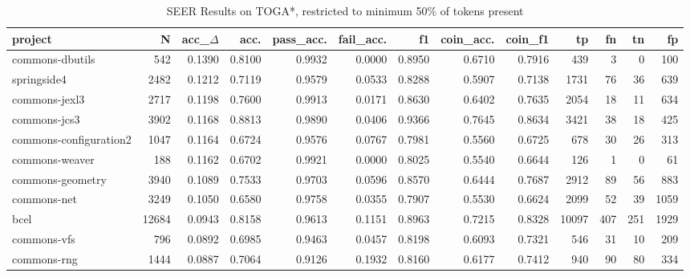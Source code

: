 \begin{table*}
\centering
\caption{SEER Results on TOGA*, restricted to minimum 50\% of tokens present}
\label{tab:toga_results_50}
\begin{tabular}{lrrrrrrrrrrrr}
\toprule
                project &       N &  acc\_$\Delta$ &    acc. &  pass\_acc. &  fail\_acc. &      f1 &  coin\_acc. &  coin\_f1 &      tp &    fn &   tn &     fp \\
\midrule
        commons-dbutils &     542 &      0.1390 &  0.8100 &     0.9932 &     0.0000 &  0.8950 &     0.6710 &   0.7916 &     439 &     3 &    0 &    100 \\
            springside4 &    2482 &      0.1212 &  0.7119 &     0.9579 &     0.0533 &  0.8288 &     0.5907 &   0.7138 &    1731 &    76 &   36 &    639 \\
          commons-jexl3 &    2717 &      0.1198 &  0.7600 &     0.9913 &     0.0171 &  0.8630 &     0.6402 &   0.7635 &    2054 &    18 &   11 &    634 \\
           commons-jcs3 &    3902 &      0.1168 &  0.8813 &     0.9890 &     0.0406 &  0.9366 &     0.7645 &   0.8634 &    3421 &    38 &   18 &    425 \\
 commons-configuration2 &    1047 &      0.1164 &  0.6724 &     0.9576 &     0.0767 &  0.7981 &     0.5560 &   0.6725 &     678 &    30 &   26 &    313 \\
         commons-weaver &     188 &      0.1162 &  0.6702 &     0.9921 &     0.0000 &  0.8025 &     0.5540 &   0.6644 &     126 &     1 &    0 &     61 \\
       commons-geometry &    3940 &      0.1089 &  0.7533 &     0.9703 &     0.0596 &  0.8570 &     0.6444 &   0.7687 &    2912 &    89 &   56 &    883 \\
            commons-net &    3249 &      0.1050 &  0.6580 &     0.9758 &     0.0355 &  0.7907 &     0.5530 &   0.6624 &    2099 &    52 &   39 &   1059 \\
                   bcel &   12684 &      0.0943 &  0.8158 &     0.9613 &     0.1151 &  0.8963 &     0.7215 &   0.8328 &   10097 &   407 &  251 &   1929 \\
            commons-vfs &     796 &      0.0892 &  0.6985 &     0.9463 &     0.0457 &  0.8198 &     0.6093 &   0.7321 &     546 &    31 &   10 &    209 \\
            commons-rng &    1444 &      0.0887 &  0.7064 &     0.9126 &     0.1932 &  0.8160 &     0.6177 &   0.7412 &     940 &    90 &   80 &    334 \\

\end{tabular}
\end{table*}
